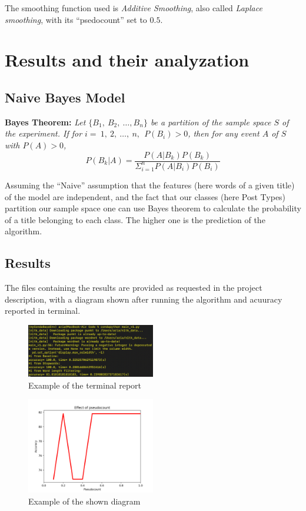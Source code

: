 \documentclass[11pt]{article}
\begin{document}
		The smoothing function used is \emph{Additive Smoothing}, also called \emph{Laplace smoothing}, with its ``psedocount'' set to $0.5$.
		
	\section{Results and their analyzation }
		\subsection{Naive Bayes Model}
			\textbf{Bayes Theorem:}
			\textit{Let $\{B_1,\ B_2,\ \ldots, B_n\}$ be a partition of the sample space $S$ of the experiment. If for $i=\ 1,\ 2,\ \ldots,\ n,\ \ P(B_i) > 0$, then for
			any event $A$ of $S$ with $P(A) > 0$,
				$$ P(B_k | A) = \frac{P(A | B_k) P(B_k)}{ \Sigma_{i=1}^{n}  P(A | B_i) P(B_i)} $$
			}
				
			Assuming the ``Naive'' assumption that the features (here words of a given title) of the model are independent, and the fact that our classes (here Post Types) partition
			our sample space one can use Bayes theorem to calculate the probability of a title belonging to each class. The higher one is the prediction of the algorithm.
			
		\subsection{Results}
			The files containing the results are provided as requested in the project description, with a diagram shown after running the algorithm and acuuracy reported in terminal.
			
					\begin{figure}[h!]
						\centering
						\includegraphics[width= 0.50\textwidth]{./Images/1.png}
						\caption{Example of the terminal report}
					\end{figure}

					\begin{figure}[h!]
						\centering
						\includegraphics[width= 0.50\textwidth]{./Images/2.png}
						\caption{Example of the shown diagram}
					\end{figure}		
	\begin{thebibliography}{9}
		\hypersetup{
			urlcolor= black
		}
			\bibitem{}
	\end{thebibliography}
\end{document}
